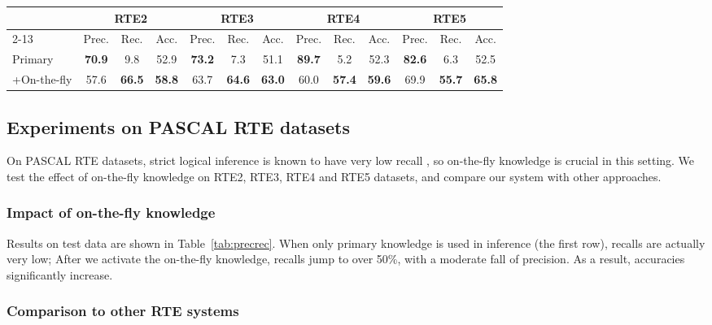 \documentclass[11pt]{article}
\begin{document}
\begin{table*}[t]
\centering
\footnotesize
\begin{tabular}{| l | c c c | c c c | c c c | c c c |}
\hline
& \multicolumn{3}{|c|}{RTE2} & \multicolumn{3}{c|}{RTE3} & \multicolumn{3}{c|}{RTE4} & \multicolumn{3}{c|}{RTE5} \\
\cline{2-13}
& Prec. & Rec. & Acc. & Prec. & Rec. & Acc. & Prec. & Rec. & Acc. & Prec. & Rec. & Acc.\\
\hline
Primary & \textbf{70.9} & 9.8 & 52.9 & \textbf{73.2} & 7.3 & 51.1 & \textbf{89.7} & 5.2 & 52.3 & \textbf{82.6} & 6.3 & 52.5 \\
+On-the-fly & 57.6 & \textbf{66.5} & \textbf{58.8} & 63.7 & \textbf{64.6} & \textbf{63.0} & 60.0 & \textbf{57.4} & \textbf{59.6} & 69.9 & \textbf{55.7} & \textbf{65.8} \\
\hline
\end{tabular}
\caption{Impact of on-the-fly knowledge}
\label{tab:precrec}
\end{table*}

\subsection{Experiments on PASCAL RTE datasets}
\label{sec:experimentrte}

On PASCAL RTE datasets, strict logical inference is known to have very low recall \cite{bos05}, 
so on-the-fly knowledge is crucial in this setting. We test the effect of on-the-fly knowledge
on RTE2, RTE3, RTE4 and RTE5 datasets, and compare our system with other approaches. 

\subsubsection{Impact of on-the-fly knowledge}

Results on test data are shown in Table~\ref{tab:precrec}. When only 
primary knowledge is used in inference (the first row), recalls are actually very low; After 
we activate the on-the-fly knowledge, recalls jump to over 50\%, with a moderate fall of precision. 
As a result, accuracies significantly increase. 

\subsubsection{Comparison to other RTE systems}
\end{document}
